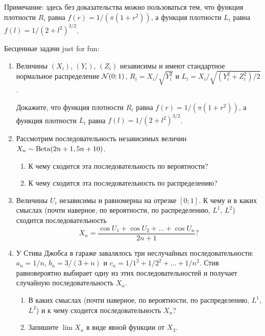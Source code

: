 \begin{enumerate}
Примечание: здесь без доказательства можно пользоваться тем, что функция плотности $R_i$ равна $f(r) = 1/(\pi(1+r^2))$, 
а функция плотности $L_i$ равна $f(l) = 1 / (2 + l^2)^{3/2}$.


\end{enumerate}

Бесценные задачи just for fun:

\begin{enumerate}[resume]
    \item Величины $(X_i)$, $(Y_i)$, $(Z_i)$ независимы и  имеют стандартное нормальное распределение $\mathcal{N}(0; 1)$,
    $R_i = X_i / \sqrt{Y_i^2}$ и $L_i = X_i /\sqrt{(Y_i^2 + Z_i^2)/2}$.

    Докажите, что функция плотности $R_i$ равна $f(r) = 1/(\pi(1+r^2))$, а функция плотности $L_i$ равна $f(l) = 1 / (2 + l^2)^{3/2}$.

    \item Рассмотрим последовательность независимых величин $X_n \sim \mathrm{Beta}(2n + 1, 5n + 10)$.
    \begin{enumerate}
        \item К чему сходится эта последовательность по вероятности?
        \item К чему сходится эта последовательность по распределению?
    \end{enumerate}

    \item Величины $U_i$ независимы и равномерны на отрезке $[0;1]$. 
    К чему и в каких смыслах (почти наверное, по вероятности, по распределению, $L^1$, $L^2$) сходится последовательность 
    \[
        X_n = \frac{\cos U_1 + \cos U_2 + \dots + \cos U_n}{2n + 1}?
    \]

    \item У Стива Джобса в гараже завалялось три неслучайных последовательности: $a_n = 1/n$, $b_n = 3 / (3 + n)$ и $c_n = 1/1^2 + 1/2^2 + \dots + 1/n^2$.
    Стив равновероятно выбирает одну из этих последовательностей и получает случайную последовательность $X_n$.

    \begin{enumerate}
        \item В каких смыслах (почти наверное, по вероятности, по распределению, $L^1$, $L^2$) и к чему сходится последовательность $X_n$?
        \item Запишите $\lim X_n$ в виде явной функции от $X_3$.
    \end{enumerate}

\end{enumerate}